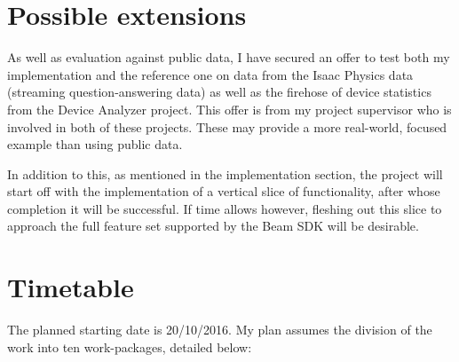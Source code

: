 \section*{Possible extensions}

As well as evaluation against public data, I have secured an offer to test both my implementation and the reference one on data from the Isaac Physics \cite{Isaac} data (streaming question-answering data) as well as the firehose of device statistics from the Device Analyzer \cite{Device} project. This offer is from my project supervisor who is involved in both of these projects. These may provide a more real-world, focused example than using public data.

In addition to this, as mentioned in the implementation section, the project will start off with the implementation of a vertical slice of functionality, after whose completion it will be successful. If time allows however, fleshing out this slice to approach the full feature set supported by the Beam SDK will be desirable.


\section*{Timetable}

The planned starting date is 20/10/2016. My plan assumes the division of the work into ten work-packages, detailed below:

